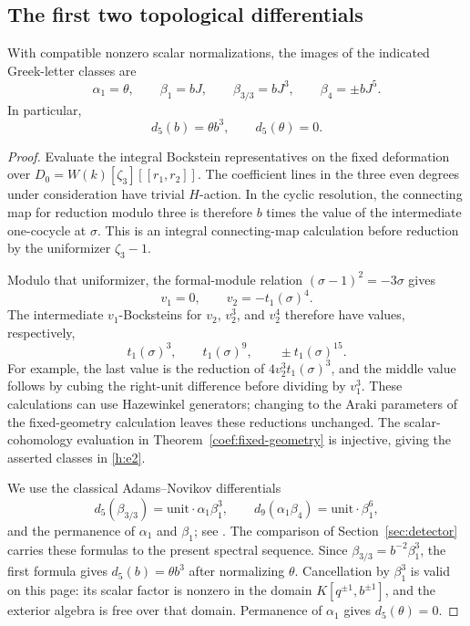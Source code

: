 \subsection{The first two topological differentials}

\begin{lemma}
 \label{h:greek-evaluation}
 With compatible nonzero scalar normalizations, the images of the
 indicated Greek-letter classes are
 \[
  \alpha_1=\theta,\qquad
  \beta_1=bJ,\qquad
  \beta_{3/3}=bJ^3,\qquad
  \beta_4=\pm bJ^5.
 \]
 In particular,
 \begin{equation}
 \label{h:d5-b}
  d_5(b)=\theta b^3,\qquad d_5(\theta)=0.
 \end{equation}
\end{lemma}

\begin{proof}
Evaluate the integral Bockstein representatives on the fixed deformation
over $D_0=W(k)[\zeta_3][[r_1,r_2]]$. The coefficient lines in the three
even degrees under consideration have trivial $H$-action. In the cyclic
resolution, the connecting map for reduction modulo three is therefore
$b$ times the value of the intermediate one-cocycle at $\sigma$.
This is an integral connecting-map calculation before reduction by the
uniformizer $\zeta_3-1$.

Modulo that uniformizer, the formal-module relation
$(\sigma-1)^2=-3\sigma$ gives
\[
 v_1=0,\qquad v_2=-t_1(\sigma)^4.
\]
The intermediate $v_1$-Bocksteins for $v_2$, $v_2^3$, and $v_2^4$
therefore have values, respectively,
\[
 t_1(\sigma)^3,\qquad t_1(\sigma)^9,\qquad
 \pm t_1(\sigma)^{15}.
\]
For example, the last value is the reduction of
$4v_2^3t_1(\sigma)^3$, and the middle value follows by cubing the
right-unit difference before dividing by $v_1^3$. These calculations
can use Hazewinkel generators; changing to the Araki parameters of the
fixed-geometry calculation leaves these reductions unchanged.
The scalar-cohomology evaluation in
Theorem~\ref{coef:fixed-geometry} is injective, giving the asserted
classes in \eqref{h:e2}.

We use the classical Adams--Novikov differentials
\begin{equation}
 \label{h:classical-differentials}
 d_5(\beta_{3/3})=\text{unit}\cdot\alpha_1\beta_1^3,
 \qquad
 d_9(\alpha_1\beta_4)=\text{unit}\cdot\beta_1^6,
\end{equation}
and the permanence of $\alpha_1$ and $\beta_1$; see
\cite[Lemma 2.5 and Table 1]{BelmontShimomura}.
The comparison of Section~\ref{sec:detector} carries these formulas to
the present spectral sequence. Since
$\beta_{3/3}=b^{-2}\beta_1^3$, the first formula gives
$d_5(b)=\theta b^3$ after normalizing $\theta$. Cancellation by
$\beta_1^3$ is valid on this page: its scalar factor is nonzero in the
domain $K[q^{\pm1},b^{\pm1}]$, and the exterior algebra is free over
that domain. Permanence of $\alpha_1$ gives $d_5(\theta)=0$.
\end{proof}


